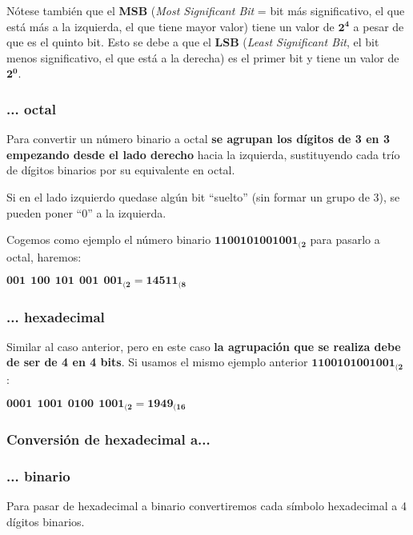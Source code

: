 Nótese también que el \textbf{MSB} (\textit{Most Significant Bit} = bit más significativo, el que está más a la izquierda, el que tiene mayor valor) tiene un valor de $\mathbf{2^4}$ a pesar de que es el quinto bit. Esto se debe a que el \textbf{LSB} (\textit{Least Significant Bit}, el bit menos significativo, el que está a la derecha) es el primer bit y tiene un valor de $\mathbf{2^0}$.

\subsubsection*{... octal}
Para convertir un número binario a octal \textbf{se agrupan los dígitos de 3 en 3 empezando desde el lado derecho} hacia la izquierda, sustituyendo cada trío de dígitos binarios por su equivalente en octal.

Si en el lado izquierdo quedase algún bit “suelto” (sin formar un grupo de 3), se pueden poner “0” a la izquierda.

Cogemos como ejemplo el número binario $\mathbf{1100101001001_{(2}}$ para pasarlo a octal, haremos:

\begin{center}
    \vspace{-15pt}
    $\mathbf{001\ \ 100\ \ 101\ \ 001\ \ 001_{(2} = 14511_{(8}}$
    \vspace{-15pt}
\end{center}

\subsubsection*{... hexadecimal}
Similar al caso anterior, pero en este caso \textbf{la agrupación que se realiza debe de ser de 4 en 4 bits}. Si usamos el mismo ejemplo anterior $\mathbf{1100101001001_{(2}}$ :

\begin{center}
    \vspace{-15pt}
    $\mathbf{0001\ \ 1001\ \ 0100\ \ 1001_{(2} = 1949_{(16}}$
    \vspace{25pt}
\end{center}



\subsubsection{Conversión de hexadecimal a...}
\subsubsection*{... binario}
Para pasar de hexadecimal a binario convertiremos cada símbolo hexadecimal a 4 dígitos binarios.

